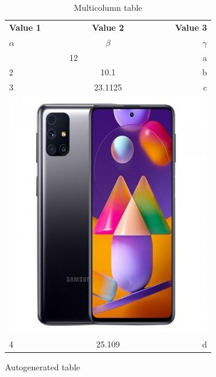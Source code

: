 \documentclass{article}
\begin{document}
	\begin{table}[h!]
		\begin{center}
		\caption{Multicolumn table}
		\label{tab:table 3}
			\begin{tabular}{|l|c|r|}
				\hline
				\textbf{Value 1} & \textbf{Value 2} & \textbf{Value 3}\\
				$\alpha$ & $\beta$ & $\gamma$\\
				\hline
				\multicolumn{2}{|c|}{12} & a\\
				\hline
				2 & 10.1 & b\\
				3 & 23.1125 & c\\
				\hline
				\multicolumn{3}{|c|}{\includegraphics[width=0.09\linewidth]{phone.jpg}}\\
				\hline
				4 & 25.109 & d\\
				\hline
			\end{tabular}
		\end{center}
	\end{table}
	\newpage
	
	
	
	\begin{table}[h!]
		\caption{Autogenerated table}
		\label{table1}
		
		
	\end{table}
\end{document}
